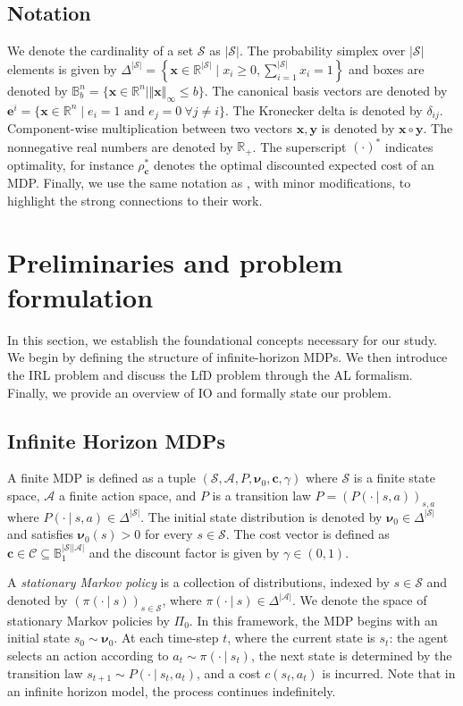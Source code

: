 \documentclass[10pt]{article} %
\def\C{\ensuremath{\mathcal{C}}}
\def\Ac{\ensuremath{\mathcal{A}}}
\def\vc{{\bm{c}}}
\def\ve{{\bm{e}}}
\def\vx{{\bm{x}}}
\def\vy{{\bm{y}}}
\def\vnu{{\bm{\nu}}}
\def\evc{{c}}
\def\eve{{e}}
\def\evx{{x}}
\def\sB{{\mathbb{B}}}
\newcommand{\R}{\mathbb{R}}
\newcommand{\St}{\mathcal{S}}
\begin{document}
\subsection{Notation}
We denote the cardinality of a set $\St$ as \( |\St| \). The probability simplex over $|\St|$ elements is given by $\Delta^{|\St|} = \left\{ \vx \in \R^{|\St|} \mid \evx_i \geq 0, \sum_{i=1}^{|\St|} \evx_i = 1 \right\}$ and boxes are denoted by $\sB_b^{n} = \{\vx\in\R^n \mid \Vert \vx \Vert_\infty \leq b\}$. The canonical basis vectors are denoted by $\ve^{i} = \{\vx \in \R^n \mid \eve_i = 1 \text{ and } \eve_j=0 \: \forall j\neq i\}$. The Kronecker delta is denoted by $\delta_{ij}$. Component-wise multiplication between two vectors $\vx,\vy$ is denoted by $\vx\circ\vy$. The nonnegative real numbers are denoted by $\R_+$. The superscript $(\cdot)^*$ indicates optimality, for instance $\rho_\vc^*$ denotes the optimal discounted expected cost of an MDP. Finally, we use the same notation as \cite{Kamoutsi2021}, with minor modifications, to highlight the strong connections to their work.

\section{Preliminaries and problem formulation} \label{sec:preliminaries}
In this section, we establish the foundational concepts necessary for our study. We begin by defining the structure of infinite-horizon MDPs. We then introduce the IRL problem and discuss the LfD problem through the AL formalism. Finally, we provide an overview of IO and formally state our problem.

\subsection{Infinite Horizon MDPs}
A finite MDP is defined as a tuple $(\St,\Ac, P, \vnu_0, \vc, \gamma)$ where $\St$ is a finite state space, $\Ac$ a finite action space, and $P$ is a transition law $P = (P(\cdot \:|\: s,a))_{s,a}$ where $P(\cdot\:|\: s,a) \in \Delta^{|\St|}$. The initial state distribution is denoted by $\vnu_0 \in \Delta^{|\St|}$ and satisfies $\vnu_0(s) > 0$ for every $s\in\St$. The cost vector is defined as $\vc \in \C \subseteq \sB_1^{|\St||\Ac|}$  and the discount factor is given by $\gamma \in (0,1)$. \par

A \textit{stationary Markov policy} is a collection of distributions, indexed by $s\in\St$ and denoted by $(\pi(\cdot\:|\:s))_{s\in\St}$, where $\pi(\cdot\:|\:s) \in \Delta^{|\Ac|}$. We denote the space of stationary Markov policies by $\Pi_0$. In this framework, the MDP begins with an initial state $s_0\sim \vnu_0$. At each time-step $t$, where the current state is $s_t$: the agent selects an action according to $a_t\sim\pi(\cdot\:|\: s_t)$, the next state is determined by the transition law $s_{t+1}\sim P(\cdot\:|\: s_t, a_t)$, and a cost $\evc(s_t,a_t)$ is incurred. Note that in an infinite horizon model, the process continues indefinitely.\par 
\end{document}
